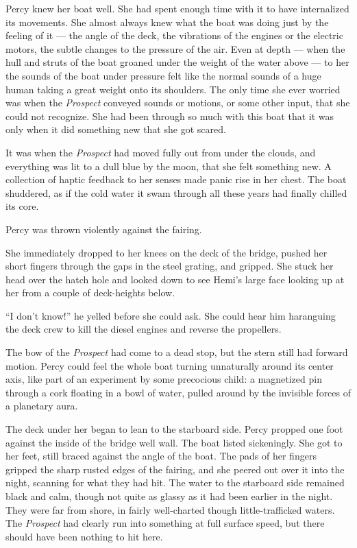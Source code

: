 \documentclass[
]{scrbook}
\begin{document}
Percy knew her boat well. She had spent enough time with it to have
internalized its movements. She almost always knew what the boat was
doing just by the feeling of it --- the angle of the deck, the
vibrations of the engines or the electric motors, the subtle changes to
the pressure of the air. Even at depth --- when the hull and struts of
the boat groaned under the weight of the water above --- to her the
sounds of the boat under pressure felt like the normal sounds of a huge
human taking a great weight onto its shoulders. The only time she ever
worried was when the \emph{Prospect} conveyed sounds or motions, or some
other input, that she could not recognize. She had been through so much
with this boat that it was only when it did something new that she got
scared.

It was when the \emph{Prospect} had moved fully out from under the
clouds, and everything was lit to a dull blue by the moon, that she felt
something new. A collection of haptic feedback to her senses made panic
rise in her chest. The boat shuddered, as if the cold water it swam
through all these years had finally chilled its core.

Percy was thrown violently against the fairing.

She immediately dropped to her knees on the deck of the bridge, pushed
her short fingers through the gaps in the steel grating, and gripped.
She stuck her head over the hatch hole and looked down to see Hemi's
large face looking up at her from a couple of deck-heights below.

``I don't know!'' he yelled before she could ask. She could hear him
haranguing the deck crew to kill the diesel engines and reverse the
propellers.

The bow of the \emph{Prospect} had come to a dead stop, but the stern
still had forward motion. Percy could feel the whole boat turning
unnaturally around its center axis, like part of an experiment by some
precocious child: a magnetized pin through a cork floating in a bowl of
water, pulled around by the invisible forces of a planetary aura.

The deck under her began to lean to the starboard side. Percy propped
one foot against the inside of the bridge well wall. The boat listed
sickeningly. She got to her feet, still braced against the angle of the
boat. The pads of her fingers gripped the sharp rusted edges of the
fairing, and she peered out over it into the night, scanning for what
they had hit. The water to the starboard side remained black and calm,
though not quite as glassy as it had been earlier in the night. They
were far from shore, in fairly well-charted though little-trafficked
waters. The \emph{Prospect} had clearly run into something at full
surface speed, but there should have been nothing to hit here.
\end{document}
